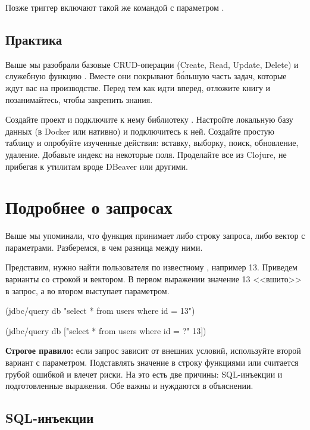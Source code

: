 Позже триггер включают такой же командой с параметром .

\subsection{Практика}

Выше мы разобрали базовые CRUD-операции (Create, Read, Update, Delete) и служебную функцию . Вместе они покрывают б\'{о}льшую часть задач, которые ждут вас на производстве. Перед тем как идти вперед, отложите книгу и позанимайтесь, чтобы закрепить знания.

Создайте проект и подключите к нему библиотеку . Настройте локальную базу данных (в Docker или нативно) и подключитесь к ней. Создайте простую таблицу и опробуйте изученные действия: вставку, выборку, поиск, обновление, удаление. Добавьте индекс на некоторые поля. Проделайте все из Clojure, не прибегая к утилитам вроде DBeaver или другими.

\section{Подробнее о запросах}

Выше мы упоминали, что функция  принимает либо строку запроса, либо вектор с параметрами. Разберемся, в чем разница между ними.

Представим, нужно найти пользователя по известному , например 13. Приведем варианты со строкой и вектором. В первом выражении значение 13 <<вшито>> в запрос, а во втором выступает параметром.

\begin{english}
  \begin{clojure}
(jdbc/query db
            "select * from users where id = 13")

(jdbc/query db
            ["select * from users where id = ?" 13])
  \end{clojure}
\end{english}

\textbf{Строгое правило:} если запрос зависит от внешних условий, используйте второй вариант с параметром. Подставлять значение в строку функциями  или  считается грубой ошибкой и влечет риски. На это есть две причины: SQL-инъекции и подготовленные выражения. Обе важны и нуждаются в объяснении.

\subsection{SQL-инъекции}

